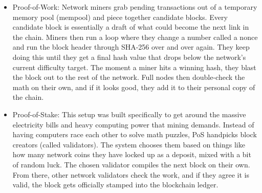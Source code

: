 \begin{itemize}
    \item Proof-of-Work: Network miners grab pending transactions out of a temporary memory pool (mempool) and piece together candidate blocks. Every candidate block is essentially a draft of what could become the next link in the chain. Miners then run a loop where they change a number called a nonce and run the block header through SHA-256 over and over again. They keep doing this until they get a final hash value that drops below the network's current difficulty target\cite{nakamoto2008bitcoin}. The moment a miner hits a winning hash, they blast the block out to the rest of the network. Full nodes then double-check the math on their own, and if it looks good, they add it to their personal copy of the chain.

          

    \item Proof-of-Stake: This setup was built specifically to get around the massive electricity bills and heavy computing power that mining demands. Instead of having computers race each other to solve math puzzles, PoS handpicks block creators (called validators). The system chooses them based on things like how many network coins they have locked up as a deposit, mixed with a bit of random luck\cite{buterin2019casper}. The chosen validator compiles the next block on their own. From there, other network validators check the work, and if they agree it is valid, the block gets officially stamped into the blockchain ledger\cite{nguyen2019pos}\cite{buterin2019casper}.

          
\end{itemize}